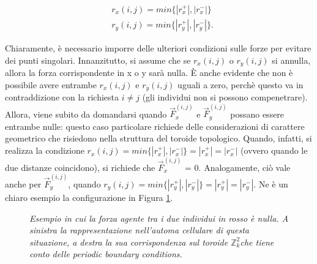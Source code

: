\documentclass{article}
\newcommand{\Zii}{$\mathbb{Z}^2_k$}
\begin{document}
\begin{equation}
\begin{aligned} 
&r_x(i,j) = min\{|r_x^+|, |r_x^-|\}\\
&r_y(i,j) = min\{|r_y^+|, |r_y^-|\}.
\end{aligned}
\end{equation}

Chiaramente, è necessario imporre delle ulteriori condizioni sulle forze per evitare dei punti singolari. Innanzitutto, si assume che se $r_x(i,j)$ o $r_y(i,j)$ si annulla, allora la forza corrispondente in x o y sarà nulla. È anche evidente che non è possibile avere entrambe $r_x(i,j)$ e $r_y(i,j)$ uguali a zero, perchè questo va in contraddizione con la richiesta $i\neq j$ (gli individui non si possono compenetrare). Allora, viene subito da domandarsi quando $\vec{F}^{(i,j)}_x$ e $\vec{F}^{(i,j)}_y$ possano essere entrambe nulle: questo caso particolare richiede delle considerazioni di carattere geometrico che risiedono nella struttura del toroide topologico. Quando, infatti, si realizza la condizione $r_x(i,j) = min\{|r_x^+|, |r_x^-|\} = |r_x^+| = |r_x^-|$ (ovvero quando le due distanze coincidono), si richiede che $\vec{F}^{(i,j)}_x$ = 0. Analogamente, ciò vale anche per $\vec{F}^{(i,j)}_y$, quando $r_y(i,j) = min\{|r_y^+|, |r_y^-|\} = |r_y^+| = |r_y^-|$. Ne è un chiaro esempio la configurazione in Figura \ref{Fig:8}.

\begin{figure}[hb]
\centering
\begin{subfigure}[h]{0.48\textwidth}
\centering
{}
\end{subfigure}
\hfill
\begin{subfigure}[h]{0.48\textwidth}
         \centering
{}
\end{subfigure}
\caption{\textit{Esempio in cui la forza agente tra i due individui in rosso è nulla. A sinistra la rappresentazione nell'automa cellulare di questa situazione, a destra la sua corrispondenza sul toroide \Zii  che tiene conto delle periodic boundary conditions.}}
\label{Fig:8}
\end{figure}
\end{document}
